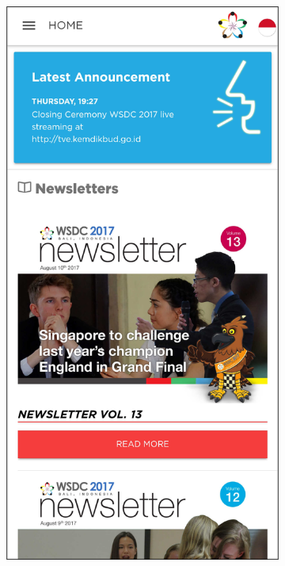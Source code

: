 \begin{figure}[H]
     \centering
     \begin{subfigure}[b]{0.3\textwidth}
        \centering
    \includegraphics[scale=0.4]{Gambar/HomePage.png}

\end{subfigure}
\end{figure}
